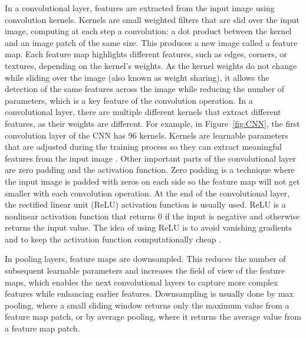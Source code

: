 In a convolutional layer, features are extracted from the input image using convolution kernels. Kernels are small weighted filters that are slid over the input image, computing at each step a convolution: a dot product between the kernel and an image patch of the same size. \cite{computation11030052} This produces a new image called a feature map. Each feature map highlights different features, such as edges, corners, or textures, depending on the kernel's weights. As the kernel weights do not change while sliding over the image (also known as weight sharing), it allows the detection of the same features across the image while reducing the number of parameters, which is a key feature of the convolution operation. In a convolutional layer, there are multiple different kernels that extract different features, as their weights are different. \cite{CNNradiology} For example, in Figure~\ref{fig:CNN}, the first convolution layer of the CNN has 96 kernels. Kernels are learnable parameters that are adjusted during the training process so they can extract meaningful features from the input image \cite{computation11030052}. Other important parts of the convolutional layer are zero padding and the activation function. Zero padding is a technique where the input image is padded with zeros on each side so the feature map will not get smaller with each convolution operation. At the end of the convolutional layer, the rectified linear unit (ReLU) activation function is usually used. ReLU is a nonlinear activation function that returns 0 if the input is negative and otherwise returns the input value. \cite{CNNradiology} The idea of using ReLU is to avoid vanishing gradients and to keep the activation function computationally cheap \cite{herberg2023lecturenotesneuralnetwork}.

In pooling layers, feature maps are downsampled. This reduces the number of subsequent learnable parameters and increases the field of view of the feature maps, which enables the next convolutional layers to capture more complex features while enhancing earlier features. Downsampling is usually done by max pooling, where a small sliding window returns only the maximum value from a feature map patch, or by average pooling, where it returns the average value from a feature map patch. \cite{CNNradiology}

